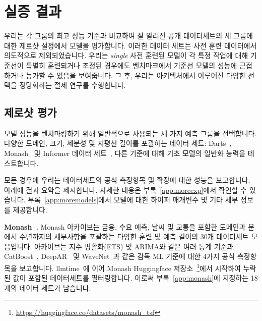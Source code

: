 \documentclass{article}
\begin{document}
\section{실증 결과}
\label{sec:emp}

우리는 각 그룹의 최고 성능 기준과 비교하여 잘 알려진 공개 데이터세트의 세 그룹에 대한 제로샷 설정에서 모델을 평가합니다. 이러한 데이터 세트는 사전 훈련 데이터에서 의도적으로 제외되었습니다. 우리는 \textit{single} 사전 훈련된 모델이 각 특정 작업에 대해 기준선이 특별히 훈련되거나 조정된 경우에도 벤치마크에서 기준선 모델의 성능에 근접하거나 능가할 수 있음을 보여줍니다. 그 후, 우리는 아키텍처에서 이루어진 다양한 선택을 정당화하는 절제 연구를 수행합니다.

\subsection{제로샷 평가}
\label{sec:zeroshot}
모델 성능을 벤치마킹하기 위해 일반적으로 사용되는 세 가지 예측 그룹을 선택합니다.
다양한 도메인, 크기, 세분성 및 지평선 길이를 포괄하는 데이터 세트: Darts~\citep{herzen2022darts}, Monash~\citep{godahewa2021monash} 및 Informer 데이터 세트~\citep{zhou2021informer}, 다른 기준에 대해 기초 모델의 일반화 능력을 테스트합니다.

모든 경우에 우리는  데이터세트의 공식 측정항목 및 확장에 대한 성능을 보고합니다. 아래에 결과 요약을 제시합니다. 자세한 내용은 부록~\ref{app:moreexp}에서 확인할 수 있습니다. 부록~\ref{app:moremodels}에서 모델에 대한 하이퍼 매개변수 및 기타 세부 정보를 제공합니다.


{\bf Monash~\citep{godahewa2021monash}.} Monash 아카이브는 금융, 수요 예측, 날씨 및 교통을 포함한 도메인과 분에서 수년까지의 세부사항을 포괄하는 다양한 훈련 및 예측 길이의 30개 데이터세트 모음입니다. 아카이브는 지수 평활화(ETS) 및 ARIMA와 같은 여러 통계 기준과 CatBoost~\citep{prokhorenkova2018catboost}, DeepAR~\citep{salinas2020deepar} 및 WaveNet~\citep{oord2016wavenet}과 같은 감독 ML 기준에 대한 4가지 공식 측정항목을 보고합니다. llmtime~\citep{gruver2023large}에 이어 Monash Huggingface 저장소~\footnote{\url{https://huggingface.co/datasets/monash_tsf}}에서 시작하여 누락된 값이 포함된 데이터세트를 필터링합니다. 이로써 부록~\ref{app:monash}에 지정하는 18개의 데이터 세트가 남습니다.
\end{document}
